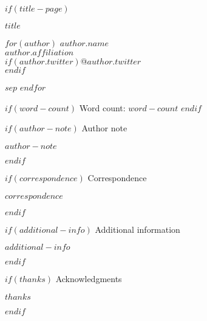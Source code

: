 \documentclass[letterpaper,12pt]{article}
\begin{document}
$if(title-page)$

\begin{titlepage}
\thispagestyle{title}
\center

\vspace*{0.5in}
{\large\bfseries $title$}

\vspace{\baselineskip}

$for(author)$
$author.name$ \\
$author.affiliation$ \\
$if(author.twitter)$@$author.twitter$ \\$endif$

$sep$ \vspace{\baselineskip}
$endfor$

\vspace{0.25in}

$if(word-count)$
{\center Word count: $word-count$}
$endif$

\vspace{0.5in}

$if(author-note)$
{\center Author note}

\begin{flushleft}
$author-note$
\end{flushleft}
$endif$

$if(correspondence)$
{\center Correspondence}

\begin{flushleft}
$correspondence$
\end{flushleft}
$endif$

$if(additional-info)$
{\center Additional information}

\begin{flushleft}
$additional-info$
\end{flushleft}
$endif$

$if(thanks)$
{\center Acknowledgments}

\begin{flushleft}
$thanks$
\end{flushleft}
$endif$

\vfill  %

\end{titlepage}

\doublespacing

\begin{abstract}
\noindent $abstract$
\end{abstract}
\end{document}
